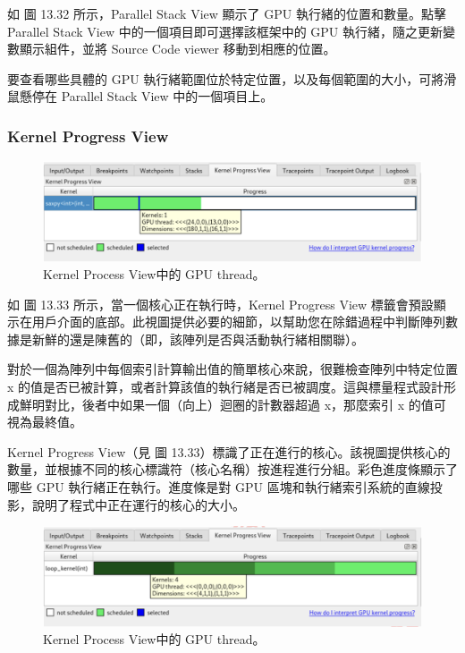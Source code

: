 如 圖 13.32 所示，Parallel Stack View 顯示了 GPU 執行緒的位置和數量。點擊 Parallel Stack View 中的一個項目即可選擇該框架中的 GPU 執行緒，隨之更新變數顯示組件，並將 Source Code viewer 移動到相應的位置。

要查看哪些具體的 GPU 執行緒範圍位於特定位置，以及每個範圍的大小，可將滑鼠懸停在 Parallel Stack View 中的一個項目上。


\subsubsection{Kernel Progress View}

\begin{figure}
    \centering
    \includegraphics[width=0.9\linewidth]{FileAusiliari/Screenshots/Figure13-33.png}
    \caption{Kernel Process View中的 GPU thread。}
    \label{fig:PAPI33}
\end{figure}

如 圖 13.33 所示，當一個核心正在執行時，Kernel Progress View 標籤會預設顯示在用戶介面的底部。此視圖提供必要的細節，以幫助您在除錯過程中判斷陣列數據是新鮮的還是陳舊的（即，該陣列是否與活動執行緒相關聯）。

對於一個為陣列中每個索引計算輸出值的簡單核心來說，很難檢查陣列中特定位置 x 的值是否已被計算，或者計算該值的執行緒是否已被調度。這與標量程式設計形成鮮明對比，後者中如果一個（向上）迴圈的計數器超過 x，那麼索引 x 的值可視為最終值。

Kernel Progress View（見 圖 13.33）標識了正在進行的核心。該視圖提供核心的數量，並根據不同的核心標識符（核心名稱）按進程進行分組。彩色進度條顯示了哪些 GPU 執行緒正在執行。進度條是對 GPU 區塊和執行緒索引系統的直線投影，說明了程式中正在運行的核心的大小。

\begin{figure}
    \centering
    \includegraphics[width=0.9\linewidth]{FileAusiliari/Screenshots/Figure13-34.png}
    \caption{Kernel Process View中的 GPU thread。}
    \label{fig:PAPI34}
\end{figure}

